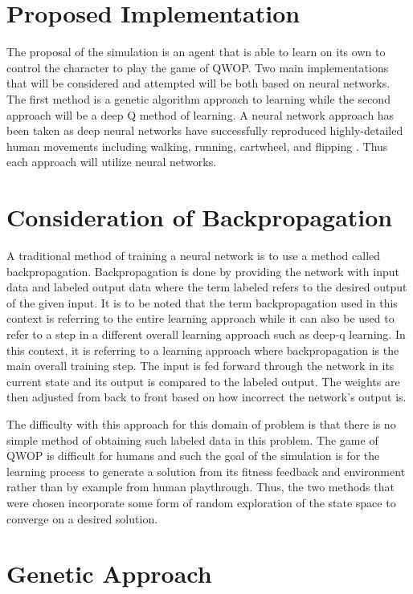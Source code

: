 \documentclass[letterpaper]{article} %
\begin{document}
\section{Proposed Implementation}

The proposal of the simulation is an agent that is able to learn on its own to control the character to play the game of QWOP. Two main implementations that will be considered and attempted will be both based on neural networks. The first method is a genetic algorithm approach to learning while the second approach will be a deep Q method of learning. A neural network approach has been taken as deep neural networks have successfully reproduced highly-detailed human movements including walking, running, cartwheel, and flipping \cite{2018-TOG-deepMimic}. Thus each approach will utilize neural networks.

\section{Consideration of Backpropagation}

A traditional method of training a neural network is to use a method called backpropagation. Backpropagation is done by providing the network with input data and labeled output data where the term labeled refers to the desired output of the given input. It is to be noted that the term backpropagation used in this context is referring to the entire learning approach while it can also be used to refer to a step in a different overall learning approach such as deep-q learning. In this context, it is referring to a learning approach where backpropagation is the main overall training step. The input is fed forward through the network in its current state and its output is compared to the labeled output. The weights are then adjusted from back to front based on how incorrect the network's output is. 

\par The difficulty with this approach for this domain of problem is that there is no simple method of obtaining such labeled data in this problem. The game of QWOP is difficult for humans and such the goal of the simulation is for the learning process to generate a solution from its fitness feedback and environment rather than by example from human playthrough. Thus, the two methods that were chosen incorporate some form of random exploration of the state space to converge on a desired solution.

\section{Genetic Approach}
\end{document}
